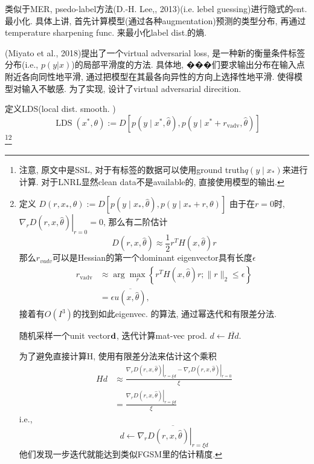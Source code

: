 \documentclass{article}
\begin{document}
类似于MER, psedo-label方法(D.-H.   Lee,, 2013)(i.e. lebel guessing)进行隐式的ent.最小化. 具体上讲, 首先计算模型(通过各种augmentation)预测的类型分布, 再通过temperature sharpening func. 来最小化label dist.的熵.

(Miyato et al., 2018)提出了一个virtual adversarial loss, 是一种新的衡量条件标签分布(i.e., $p(y|x)$)的局部平滑度的方法. 具体地, ���们要求输出分布在输入点附近各向同性地平滑, 通过把模型在其最各向异性的方向上选择性地平滑. 使得模型对输入不敏感. 
为了实现, 设计了virtual adversarial direcition.

定义LDS(local dist. smooth. )
\begin{equation}
    \operatorname{LDS}\left(x^{*}, \theta\right):=D\left[p\left(y \mid x^{*}, \hat{\theta}\right), p\left(y \mid x^{*}+r_{\mathrm{vadv}}, \hat \theta\right)\right]
\end{equation}
\footnote{
    注意, 原文中是SSL, 对于有标签的数据可以使用ground truth$q\left(y \mid x_{*}\right)$来进行计算. 对于LNRL显然clean data不是available的, 直接使用模型的输出.
}\footnote{
     定义
    $D\left(r, x_{*}, \theta\right) := D\left[p\left(y \mid x_{*}, \hat{\theta}\right), p\left(y \mid x_{*}+r, \theta\right)\right]$
    由于在$r=0$时, $\left.\nabla_{r} D(r, x, \hat{\theta})\right|_{r=0}=0$, 那么有二阶估计
    \begin{equation}
        D(r, x, \hat{\theta}) \approx \frac{1}{2} r^{T} H(x, \hat{\theta}) r
    \end{equation}
    那么$r_{vadv}$可以是Hessian的第一个dominant eigenvector具有长度$\epsilon$
    \begin{equation}
        \begin{aligned}
        r_{\mathrm{vadv}} & \approx \arg \max _{r}\left\{r^{T} H(x, \hat{\theta}) r ;\|r\|_{2} \leq \epsilon\right\} \\
        &=\epsilon \overline{u(x, \hat{\theta})},
        \end{aligned}
    \end{equation}
    接着有$O(I^3)$的找到如此eigenvec. 的算法, 通过幂迭代和有限差分法.

    随机采样一个unit vector$\textbf{d}$, 迭代计算mat-vec prod. 
    $d \leftarrow \overline{H d}$.

    为了避免直接计算H, 使用有限差分法来估计这个乘积
    \begin{equation}
        \begin{aligned}
        H d & \approx \frac{\left.\nabla_{r} D(r, x, \hat{\theta})\right|_{r=\xi d}-\left.\nabla_{r} D(r, x, \hat{\theta})\right|_{r=0}}{\xi} \\
        &=\frac{\left.\nabla_{r} D(r, x, \hat{\theta})\right|_{r=\xi d}}{\xi}
        \end{aligned}
    \end{equation}
    i.e.,
    \begin{equation}
        d \leftarrow \overline{\left.\nabla_{r} D(r, x, \hat{\theta})\right|_{r=\xi d}}
    \end{equation}
    他们发现一步迭代就能达到类似FGSM里的估计精度.
}
\end{document}
